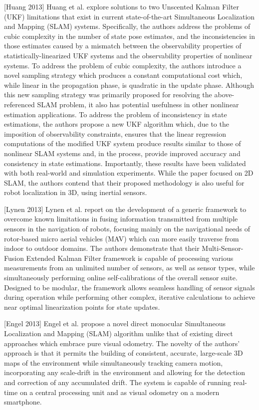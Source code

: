 [Huang 2013] Huang et al. explore solutions to two Unscented Kalman Filter (UKF) limitations that exist in current state-of-the-art Simultaneous Localization and Mapping (SLAM) systems. Specifically, the authors address the problems of cubic complexity in the number of state pose estimates, and the inconsistencies in those estimates caused by a mismatch between the observability properties of statistically-linearized UKF systems and the observability properties of nonlinear systems. To address the problem of cubic complexity, the authors introduce a novel sampling strategy which produces a constant computational cost which, while linear in the propagation phase, is quadratic in the update phase. Although this new sampling strategy was primarily proposed for resolving the above-referenced SLAM problem, it also has potential usefulness in other nonlinear estimation applications. To address the problem of inconsistency in state estimations, the authors propose a new UKF algorithm which, due to the imposition of observability constraints, ensures that the linear regression computations of the modified UKF system produce results similar to those of nonlinear SLAM systems and, in the process, provide improved accuracy and consistency in state estimations. Importantly, these results have been validated with both real-world and simulation experiments. While the paper focused on 2D SLAM, the authors contend that their proposed methodology is also useful for robot localization in 3D, using inertial sensors.

[Lynen 2013] Lynen et al. report on the development of a generic framework to overcome known limitations in fusing information transmitted from multiple sensors in the navigation of robots, focusing mainly on the navigational needs of rotor-based micro aerial vehicles (MAV) which can more easily traverse from indoor to outdoor domains. The authors demonstrate that their Multi-Sensor-Fusion Extended Kalman Filter framework is capable of processing various measurements from an unlimited number of sensors, as well as sensor types, while simultaneously performing online self-calibrations of the overall sensor suite. Designed to be modular, the framework allows seamless handling of sensor signals during operation while performing other complex, iterative calculations to achieve near optimal linearization points for state updates. 

[Engel 2013] Engel et al. propose a novel direct monocular Simultaneous Localization and Mapping (SLAM) algorithm unlike that of existing direct approaches which embrace pure visual odometry. The novelty of the authors' approach is that it permits the building of consistent, accurate, large-scale 3D maps of the environment while simultaneously tracking camera motion, incorporating any scale-drift in the environment and allowing for the detection and correction of any accumulated drift. The system is capable of running real-time on a central processing unit and as visual odometry on a modern smartphone.

